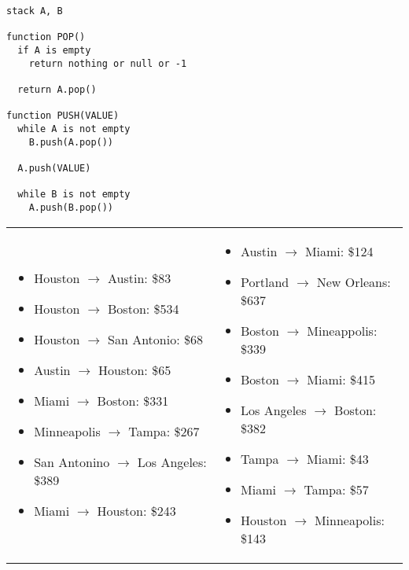 \documentclass[11pt,addpoints]{exam}
\begin{document}
\begin{questions}

\begin{verbatim}
stack A, B

function POP()
  if A is empty
    return nothing or null or -1

  return A.pop()

function PUSH(VALUE)
  while A is not empty
    B.push(A.pop())

  A.push(VALUE)

  while B is not empty
    A.push(B.pop())

\end{verbatim}



\begin{table}[H]
  \begin{tabular}{p{}p{}}
\begin{itemize}
  \item Houston $\to$ Austin: \$83
  \item Houston $\to$ Boston: \$534
  \item Houston $\to$ San Antonio: \$68
  \item Austin $\to$ Houston: \$65
  \item Miami $\to$ Boston: \$331
  \item Minneapolis $\to$ Tampa: \$267
  \item San Antonino $\to$ Los Angeles: \$389
  \item Miami $\to$ Houston: \$243
\end{itemize} &
\begin{itemize}
  \item Austin $\to$ Miami: \$124
  \item Portland $\to$ New Orleans: \$637
  \item Boston $\to$ Mineappolis: \$339
  \item Boston $\to$ Miami: \$415
  \item Los Angeles $\to$ Boston: \$382 
  \item Tampa $\to$ Miami: \$43
  \item Miami $\to$ Tampa: \$57
  \item Houston $\to$ Minneapolis: \$143
\end{itemize}
\end{tabular}
\end{table}


\end{questions}
\end{document}
